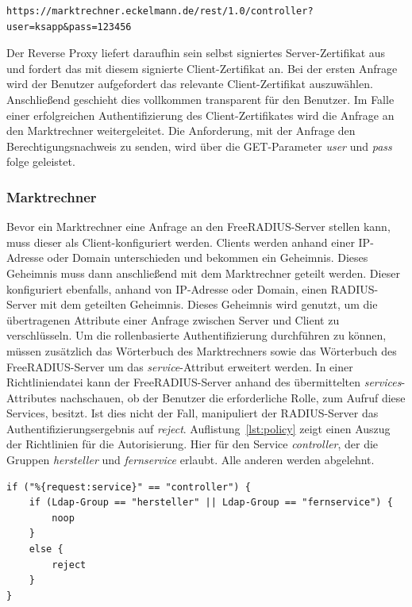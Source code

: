 \documentclass[11pt,a4paper]{report}
\begin{document}
\begin{lstlisting}[caption=HTTPS-Anfrage an Reverse Proxy, label=lst:https_request]
https://marktrechner.eckelmann.de/rest/1.0/controller?user=ksapp&pass=123456
\end{lstlisting}

Der Reverse Proxy liefert daraufhin sein selbst signiertes Server-Zertifikat aus und fordert das mit diesem signierte Client-Zertifikat an. Bei der ersten Anfrage wird der Benutzer aufgefordert das relevante Client-Zertifikat auszuwählen. Anschließend geschieht dies vollkommen transparent für den Benutzer. Im Falle einer erfolgreichen Authentifizierung des Client-Zertifikates wird die Anfrage an den Marktrechner weitergeleitet. Die Anforderung, mit der Anfrage den Berechtigungsnachweis zu senden, wird über die GET-Parameter \textit{user} und \textit{pass} folge geleistet.

\subsubsection{Marktrechner}

Bevor ein Marktrechner eine Anfrage an den FreeRADIUS-Server stellen kann, muss dieser als Client-konfiguriert werden. Clients werden anhand einer IP-Adresse oder Domain unterschieden und bekommen ein Geheimnis. Dieses Geheimnis muss dann anschließend mit dem Marktrechner geteilt werden. Dieser konfiguriert ebenfalls, anhand von IP-Adresse oder Domain, einen RADIUS-Server mit dem geteilten Geheimnis. Dieses Geheimnis wird genutzt, um die übertragenen Attribute einer Anfrage zwischen Server und Client zu verschlüsseln. Um die rollenbasierte Authentifizierung durchführen zu können, müssen zusätzlich das Wörterbuch des Marktrechners sowie das Wörterbuch des FreeRADIUS-Server um das \textit{service}-Attribut erweitert werden. In einer Richtliniendatei kann der FreeRADIUS-Server anhand des übermittelten \textit{services}-Attributes nachschauen, ob der Benutzer die erforderliche Rolle, zum Aufruf diese Services, besitzt. Ist dies nicht der Fall, manipuliert der RADIUS-Server das Authentifizierungsergebnis auf \textit{reject}. Auflistung~\ref{lst:policy} zeigt einen Auszug der Richtlinien für die Autorisierung. Hier für den Service \textit{controller}, der die Gruppen \textit{hersteller} und \textit{fernservice} erlaubt. Alle anderen werden abgelehnt.

\begin{lstlisting}[caption=Richtlinie für den controller-Service, label=lst:policy]
if ("%{request:service}" == "controller") {
    if (Ldap-Group == "hersteller" || Ldap-Group == "fernservice") {
        noop
    }
    else {
        reject
    }
}
\end{lstlisting}
\end{document}
